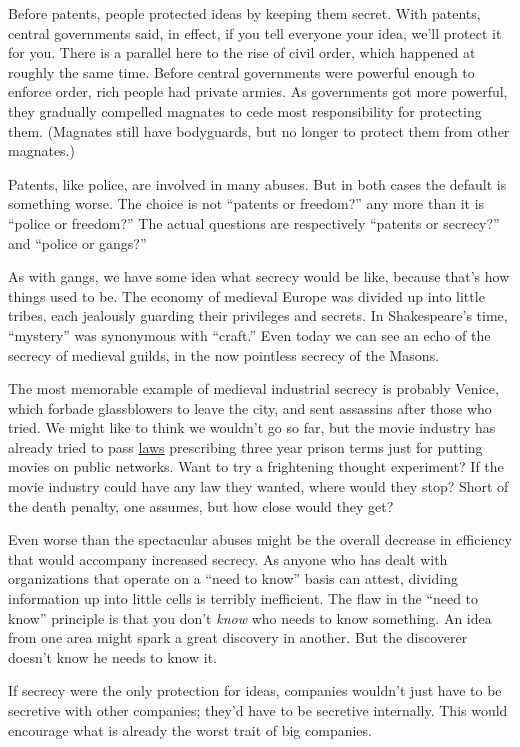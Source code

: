 Before patents, people protected ideas by keeping them secret. With
patents, central governments said, in effect, if you tell everyone your
idea, we'll protect it for you. There is a parallel here to the rise of
civil order, which happened at roughly the same time. Before central
governments were powerful enough to enforce order, rich people had
private armies. As governments got more powerful, they gradually
compelled magnates to cede most responsibility for protecting them.
(Magnates still have bodyguards, but no longer to protect them from
other magnates.)

Patents, like police, are involved in many abuses. But in both cases the
default is something worse. The choice is not ``patents or freedom?''
any more than it is ``police or freedom?'' The actual questions are
respectively ``patents or secrecy?'' and ``police or gangs?''

As with gangs, we have some idea what secrecy would be like, because
that's how things used to be. The economy of medieval Europe was divided
up into little tribes, each jealously guarding their privileges and
secrets. In Shakespeare's time, ``mystery'' was synonymous with
``craft.'' Even today we can see an echo of the secrecy of medieval
guilds, in the now pointless secrecy of the Masons.

The most memorable example of medieval industrial secrecy is probably
Venice, which forbade glassblowers to leave the city, and sent assassins
after those who tried. We might like to think we wouldn't go so far, but
the movie industry has already tried to pass
\href{http://news.com.com/2100-1026_3-5106684.html}{laws} prescribing
three year prison terms just for putting movies on public networks. Want
to try a frightening thought experiment? If the movie industry could
have any law they wanted, where would they stop? Short of the death
penalty, one assumes, but how close would they get?

Even worse than the spectacular abuses might be the overall decrease in
efficiency that would accompany increased secrecy. As anyone who has
dealt with organizations that operate on a ``need to know'' basis can
attest, dividing information up into little cells is terribly
inefficient. The flaw in the ``need to know'' principle is that you
don't \emph{know} who needs to know something. An idea from one area
might spark a great discovery in another. But the discoverer doesn't
know he needs to know it.

If secrecy were the only protection for ideas, companies wouldn't just
have to be secretive with other companies; they'd have to be secretive
internally. This would encourage what is already the worst trait of big
companies.

